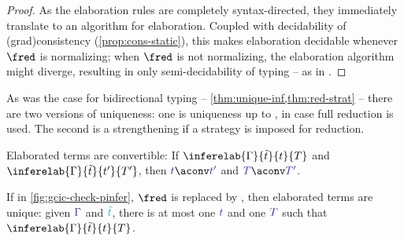 \begin{proof}

  As the elaboration rules are completely syntax-directed, they
  immediately translate to an algorithm for elaboration.
  Coupled with decidability of \kl(grad){consistency} (\cref{prop:cons-static}),
  this makes elaboration decidable whenever $\red$ is normalizing; 
  when $\red$ is not normalizing, the elaboration algorithm might diverge,
  resulting in only semi-decidability of typing – 
  as in \eg {} .

\end{proof}

As was the case for bidirectional typing – \cref{thm:unique-inf,thm:red-strat} –
there are two versions of uniqueness: one is uniqueness up to ,
in case full reduction is used.
The second is a strengthening if a  strategy is imposed for reduction.

\begin{theorem}
	\label{thm:uniqueness}
	Elaborated terms are convertible:
	If $\inferelab{\Gamma}{\tilde{t}}{t}{T}$ and $\inferelab{\Gamma}{\tilde{t}}{t'}{T'}$,
  then $\tcol{t} \aconv \tcol{t'}$ and $\tcol{T} \aconv \tcol{T'}$.
\end{theorem}

\begin{theorem}
	\label{thm:uniqueness-wh}
	If in \cref{fig:gcic-check-pinfer},  $\red$ is replaced by
  , then elaborated terms are unique:
  given $\tcol{\Gamma}$ and $\scol{\tilde{t}}$, there is at most one $\tcol{t}$
  and one $\tcol{T}$ such that $\inferelab{\Gamma}{\tilde{t}}{t}{T}$.
\end{theorem}

